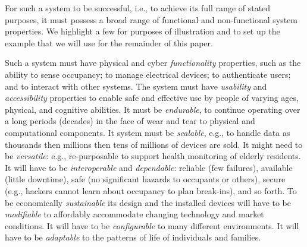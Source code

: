 \documentclass[conference]{IEEEtran}
\begin{document}
For such a system to be successful, i.e., to achieve its full range of stated purposes, it must possess a broad range of functional and non-functional system properties. We highlight a few for purposes of illustration and to set up the example that we will use for the remainder of this paper.

Such a system must have physical and cyber {\em functionality} properties, such as the ability to sense occupancy; to manage electrical devices; to authenticate users; and to interact with other systems. The system must have {\em usability} and {\em accessibility} properties to enable safe and effective use by people of varying ages, physical, and cognitive abilities. It must be {\em endurable}, to continue operating over a long periods (decades) in the face of wear and tear to physical and computational components. It system must be {\em scalable}, e.g., to handle data as thousands then millions then tens of millions of devices are sold. It might need to be {\em versatile}: e.g., re-purposable to support health monitoring of elderly residents. It will have to be {\em interoperable} and {\em dependable}: reliable (few failures), available (little downtime), safe (no significant hazards to occupants or others), secure (e.g., hackers cannot learn about occupancy to plan break-ins), and so forth. To be economically {\em sustainable} its design and the installed devices will have to be {\em modifiable} to affordably accommodate changing technology and market conditions. It will have to be {\em configurable} to many different environments. It will have to be {\em adaptable} to the patterns of life of individuals and families.


\end{document}
